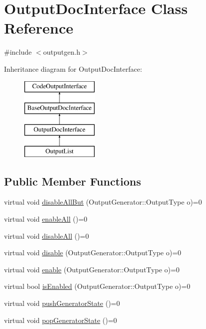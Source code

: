 \hypertarget{class_output_doc_interface}{}\section{Output\+Doc\+Interface Class Reference}
\label{class_output_doc_interface}


{\ttfamily \#include $<$outputgen.\+h$>$}

Inheritance diagram for Output\+Doc\+Interface\+:\begin{figure}[H]
\begin{center}
\leavevmode
\includegraphics[height=4.000000cm]{class_output_doc_interface}
\end{center}
\end{figure}
\subsection*{Public Member Functions}
\begin{DoxyCompactItemize}
\item 
virtual void \mbox{\hyperlink{class_output_doc_interface_a304402b5e336d9706678f3d11e5efeae}{disable\+All\+But}} (Output\+Generator\+::\+Output\+Type o)=0
\item 
virtual void \mbox{\hyperlink{class_output_doc_interface_a418b5b7b81a6d37eff05a7cfe8143573}{enable\+All}} ()=0
\item 
virtual void \mbox{\hyperlink{class_output_doc_interface_a8adfa92c26950748e6d853dde09a98f5}{disable\+All}} ()=0
\item 
virtual void \mbox{\hyperlink{class_output_doc_interface_a9fbc5bc49aefab5a46f18864f396f011}{disable}} (Output\+Generator\+::\+Output\+Type o)=0
\item 
virtual void \mbox{\hyperlink{class_output_doc_interface_ac6eb8fe41ef1c29d92348db248989263}{enable}} (Output\+Generator\+::\+Output\+Type o)=0
\item 
virtual bool \mbox{\hyperlink{class_output_doc_interface_a6b48e942d7e057f79ed44f96353dab24}{is\+Enabled}} (Output\+Generator\+::\+Output\+Type o)=0
\item 
virtual void \mbox{\hyperlink{class_output_doc_interface_aba5fd4dd5b0360723e62fedc7d353f29}{push\+Generator\+State}} ()=0
\item 
virtual void \mbox{\hyperlink{class_output_doc_interface_a4fb05016264d9c9f0946c2fd8e7b8e56}{pop\+Generator\+State}} ()=0
\end{DoxyCompactItemize}
